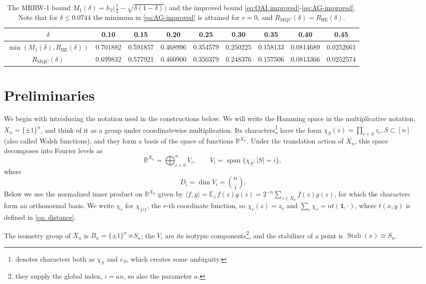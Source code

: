 \documentclass[11pt]{amsart}
\theoremstyle{plain}
\theoremstyle{remark}
\newcommand{\R}{\mathbb{R}}
\newcommand{\la}{\langle}
\newcommand{\ra}{\rangle}
\newcommand{\Stab}{\operatorname{Stab}}
\begin{document}
{\footnotesize\begin{table}[h]
\centering
\begin{tabular}{c|cccccccc}
\toprule
 $\delta$ & 0.10 & 0.15 & 0.20 & 0.25 & 0.30 & 0.35 & 0.40 & 0.45 \\
\midrule
$\min(M_1(\delta),R_{\mathrm{BE}}(\delta))$
 & 0.701882 & 0.591857 & 0.468996 & 0.354579
& 0.250225 & 0.158133 & 0.0814689 & 0.0252661 \\
$R_{\mathrm{MQC}}(\delta)$
 & 0.699832 & 0.577921 & 0.460900 & 0.350379
& 0.248376 & 0.157506 & 0.0813366 & 0.0252574 \\
\bottomrule
\end{tabular}
\medskip
\caption{The MRRW-1 bound $M_1(\delta)=h_2\bigl(\frac12-\sqrt{\delta(1-\delta)}\bigr)$
and the improved bound \eqref{eq:OAI improved}-\eqref{eq:AG-improved}.
Note that for $\delta\le 0.0744$ the minimum in \eqref{eq:AG-improved} is attained 
for $r=0$, and $R_{\mathrm{MQC}}(\delta)=R_{\mathrm{BE}}(\delta)$.}
\end{table}
}


\section{Preliminaries}\label{sec:setup}
We begin with introducing the notation used in the constructions below. We will write the Hamming space in the multiplicative notation,  $X_n=\{\pm1\}^n$, and think of it as a group under coordinatewise multiplication. Its characters\footnote{\cite{OAI26} denotes characters both as $\chi_S$ and $e_S$, which creates some ambiguity.} have the form $\chi_S(z)=\prod_{r\in S}z_r, S\subset[n]$ (also called Walsh functions), and they form a basis of the space of functions $\R^{X_n}$. Under the translation action of $X_n$, this space decomposes into Fourier levels as 
   $$\R^{X_n}=\bigoplus_{i=0}^{n}V_i, \qquad  V_i=\operatorname{span}\{\chi_S:|S|=i\},
   $$
   where
   \[
D_i=\dim V_i=\binom ni.
\]
Below we use the normalized inner product on $\R^{X_n}$ given by
$\la f,g\ra={\mathbb E}_z\,f(z)g(z)=2^{-n}\sum_{z\in X_n}f(z)g(z)$, for which
the characters form an orthonormal basis.
We write $\chi_r$ for $\chi_{\{r\}}$, the $r$-th coordinate function, so $\chi_r(z)=z_r$ and
$\sum_r \chi_r= n t(\mathbf{1}, \cdot)$, where $t(x,y)$ is defined in \eqref{eq: distance}.


The isometry group of $X_n$ is $B_n=\{\pm1\}^n\rtimes S_n$; the $V_i$ are its isotypic components\footnote{they supply the global index, $i=an$, so also the parameter $a$.}, and the stabilizer of a point is $\Stab(x)\cong S_n$.
\end{document}
